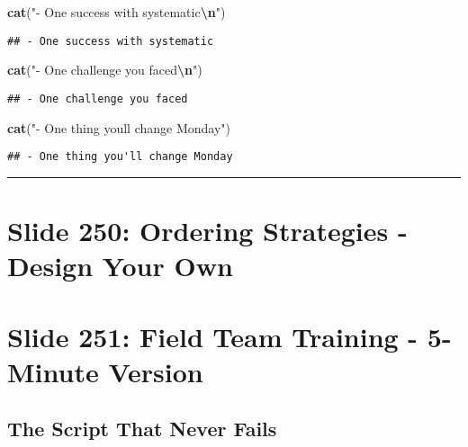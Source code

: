 \documentclass[
]{article}
\newenvironment{Shaded}{\begin{snugshade}}{\end{snugshade}}
\newcommand{\FunctionTok}[1]{\textcolor[rgb]{0.13,0.29,0.53}{\textbf{#1}}}
\newcommand{\NormalTok}[1]{#1}
\newcommand{\SpecialCharTok}[1]{\textcolor[rgb]{0.81,0.36,0.00}{\textbf{#1}}}
\newcommand{\StringTok}[1]{\textcolor[rgb]{0.31,0.60,0.02}{#1}}
\begin{document}
\begin{Shaded}
\begin{Highlighting}[]
\FunctionTok{cat}\NormalTok{(}\StringTok{"{-} One success with systematic}\SpecialCharTok{\textbackslash{}n}\StringTok{"}\NormalTok{)}
\end{Highlighting}
\end{Shaded}

\begin{verbatim}
## - One success with systematic
\end{verbatim}

\begin{Shaded}
\begin{Highlighting}[]
\FunctionTok{cat}\NormalTok{(}\StringTok{"{-} One challenge you faced}\SpecialCharTok{\textbackslash{}n}\StringTok{"}\NormalTok{)}
\end{Highlighting}
\end{Shaded}

\begin{verbatim}
## - One challenge you faced
\end{verbatim}

\begin{Shaded}
\begin{Highlighting}[]
\FunctionTok{cat}\NormalTok{(}\StringTok{"{-} One thing you\textquotesingle{}ll change Monday"}\NormalTok{)}
\end{Highlighting}
\end{Shaded}

\begin{verbatim}
## - One thing you'll change Monday
\end{verbatim}

\begin{center}\rule{0.5\linewidth}{0.5pt}\end{center}

\section{Slide 250: Ordering Strategies - Design Your
Own}\label{slide-250-ordering-strategies---design-your-own}

\section{Slide 251: Field Team Training - 5-Minute
Version}\label{slide-251-field-team-training---5-minute-version}

\subsection{The Script That Never
Fails}\label{the-script-that-never-fails}
\end{document}
